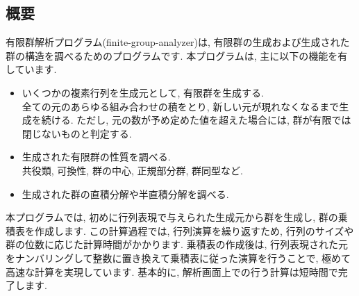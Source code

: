 \documentclass[11pt, a4paper]{jsarticle}
\begin{document}
\subsection{概要}
有限群解析プログラム(finite-group-analyzer)は, 有限群の生成および生成された群の構造を調べるためのプログラムです.
本プログラムは, 主に以下の機能を有しています.
\begin{itemize}
\item いくつかの複素行列を生成元として, 有限群を生成する. \\
全ての元のあらゆる組み合わせの積をとり, 新しい元が現れなくなるまで生成を続ける.
ただし, 元の数が予め定めた値を超えた場合には, 群が有限では閉じないものと判定する.
\item 生成された有限群の性質を調べる. \\
共役類, 可換性, 群の中心, 正規部分群, 群同型など.
\item 生成された群の直積分解や半直積分解を調べる.
\end{itemize}
本プログラムでは, 初めに行列表現で与えられた生成元から群を生成し, 群の乗積表を作成します.
この計算過程では, 行列演算を繰り返すため, 行列のサイズや群の位数に応じた計算時間がかかります.
乗積表の作成後は, 行列表現された元をナンバリングして整数に置き換えて乗積表に従った演算を行うことで, 極めて高速な計算を実現しています.
基本的に, 解析画面上での行う計算は短時間で完了します.
\end{document}
